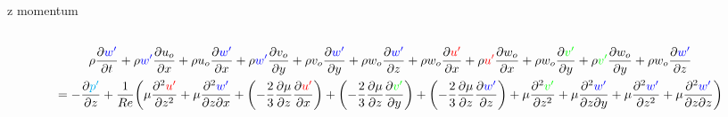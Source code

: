 \documentclass[ border=0pt, a4paper, 11pt]{article}
\numberwithin{equation}{section}
\renewcommand{\u}{\textcolor{red}{u'}}
\renewcommand{\v}{\textcolor{green}{v'}}
\newcommand{\w}{\textcolor{blue}{w'}}
\newcommand{\p}{\textcolor{cyan}{p'}}
\begin{document}
z momentum
\begin{multline}
\\\rho \frac{\partial \w }{\partial t} + \rho \w \frac{\partial u_o}{\partial x} + \rho u_o\frac{\partial \w }{\partial x}  + \rho \w \frac{\partial v_o}{\partial y} + \rho v_o\frac{\partial \w }{\partial y}  + \rho w_o\frac{\partial \w }{\partial z}  + \rho w_o\frac{\partial \u }{\partial x} + \rho \u \frac{\partial w_o}{\partial x} + \rho w_o\frac{\partial \v }{\partial y} + \rho \v \frac{\partial w_o}{\partial y} + \rho w_o\frac{\partial \w }{\partial z} \\ =-\frac{\partial \p }{\partial z} +\frac{1}{Re}\bigg ( \mu\frac{\partial^2 \u }{\partial z^2} + \mu\frac{\partial^2 \w }{\partial z \partial x} + \left(-\frac{2}{3} \frac{\partial\mu}{\partial z}\frac{\partial \u }{\partial x}\right) + \left(- \frac{2}{3}\frac{\partial\mu}{\partial z}\frac{\partial \v }{\partial y}\right) + \left(- \frac{2}{3}\frac{\partial\mu}{\partial z}\frac{\partial \w }{\partial z}\right) + \mu\frac{\partial^2 \v }{\partial z^2} + \mu\frac{\partial^2 \w }{\partial z \partial y} + \mu\frac{\partial^2 \w }{\partial z^2} + \mu\frac{\partial^2 \w }{\partial z \partial z}\bigg)\\
\end{multline}
\end{document}
